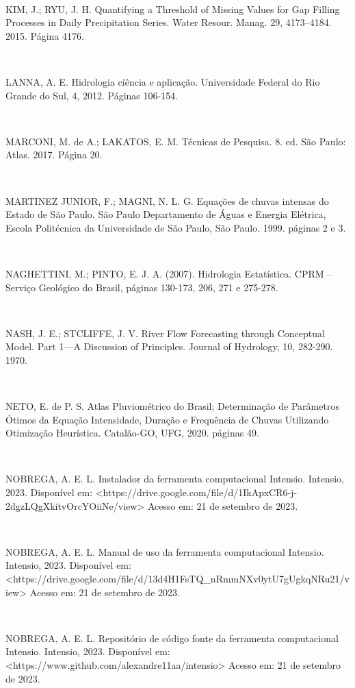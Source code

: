 \begin{flushleft}
\

KIM, J.; RYU, J. H. Quantifying a Threshold of Missing Values for Gap Filling Processes in Daily Precipitation Series. Water Resour. Manag. 29, 4173–4184. 2015. Página 4176.

\

LANNA, A. E. Hidrologia ciência e aplicação. Universidade Federal do Rio Grande do Sul, 4, 2012. Páginas 106-154.

\

MARCONI, M. de A.; LAKATOS, E. M. Técnicas de Pesquisa. 8. ed. São Paulo: Atlas. 2017. Página 20.

\

MARTINEZ JUNIOR, F.; MAGNI, N. L. G. Equações de chuvas intensas do Estado de São Paulo. São Paulo Departamento de Águas e Energia Elétrica, Escola Politécnica da Universidade de São Paulo, São Paulo. 1999. páginas 2 e 3.

\

NAGHETTINI, M.; PINTO, E. J. A. (2007). Hidrologia Estatística. CPRM – Serviço Geológico do Brasil, páginas 130-173, 206, 271 e 275-278.

\

NASH, J. E.; STCLIFFE, J. V. River Flow Forecasting through Conceptual Model. Part 1—A Discussion of Principles. Journal of Hydrology, 10, 282-290. 1970.

\

NETO, E. de P. S. Atlas Pluviométrico do Brasil; Determinação de Parâmetros Ótimos da Equação Intensidade, Duração e Frequência de Chuvas Utilizando Otimização Heurística. Catalão-GO, UFG, 2020. páginas 49.

\newpage

\

NOBREGA, A. E. L. Instalador da ferramenta computacional Intensio. Intensio, 2023. Disponível em: <https://drive.google.com/file/d/1IkApxCR6-j-2dgzLQgXkitvOrcYOiiNe/view> Acesso em: 21 de setembro de 2023.

\

NOBREGA, A. E. L. Manual de uso da ferramenta computacional Intensio. Intensio, 2023. Disponível em: <https://drive.google.com/file/d/13d4H1FsTQ\_nRmmNXv0ytU7gUgkqNRu21/view> Acesso em: 21 de setembro de 2023.

\

NOBREGA, A. E. L. Repositório de código fonte da ferramenta computacional Intensio. Intensio, 2023. Disponível em: <https://www.github.com/alexandre11aa/intensio> Acesso em: 21 de setembro de 2023.


\end{flushleft}
